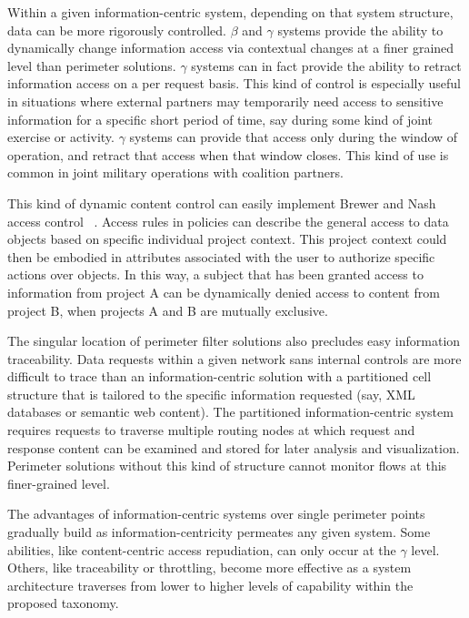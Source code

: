 Within a given information-centric system, depending on that system structure, data can be more rigorously controlled.  $\beta$ and $\gamma$ systems provide the ability to dynamically change information access via contextual changes at a finer grained level than perimeter solutions.  $\gamma$ systems can in fact provide the ability to retract information access on a per request basis.  This kind of control is especially useful in situations where external partners may temporarily need access to sensitive information for a specific short period of time, say during some kind of joint exercise or activity.  $\gamma$ systems can provide that access only during the window of operation, and retract that access when that window closes.  This kind of use is common in joint military operations with coalition partners.

This kind of dynamic content control can easily implement Brewer and Nash access control ~\cite{Brewer89}.  Access rules in policies can describe the general access to data objects based on specific individual project context.  This project context could then be embodied in attributes associated with the user to authorize specific actions over objects.  In this way, a subject that has been granted access to information from project A can be dynamically denied access to content from project B, when projects A and B are mutually exclusive.

The singular location of perimeter filter solutions also precludes easy information traceability.  Data requests within a given network sans internal controls are more difficult to trace than an information-centric solution with a partitioned cell structure that is tailored to the specific information requested (say, XML databases or semantic web content).  The partitioned information-centric system requires requests to traverse multiple routing nodes at which request and response content can be examined and stored for later analysis and visualization.  Perimeter solutions without this kind of structure cannot monitor flows at this finer-grained level.

The advantages of information-centric systems over single perimeter points gradually build as information-centricity permeates any given system.  Some abilities, like content-centric access repudiation, can only occur at the $\gamma$ level.  Others, like traceability or throttling, become more effective as a system architecture traverses from lower to higher levels of capability within the proposed taxonomy.